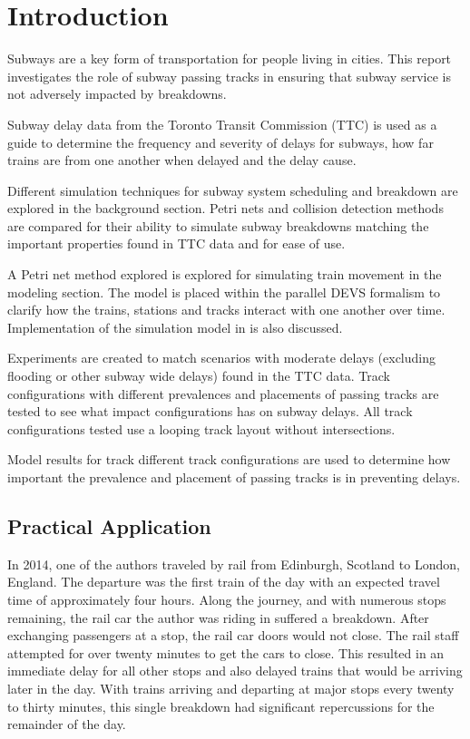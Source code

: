 \section{Introduction}

Subways are a key form of transportation for people living in cities. This
report investigates the role of subway passing tracks in ensuring that subway
service is not adversely impacted by breakdowns.

Subway delay data from the Toronto Transit Commission (TTC) is used as a guide
to determine the frequency and severity of delays for subways, how far trains 
are from one another when delayed and the delay cause.

Different simulation techniques for subway system scheduling and breakdown are
explored in the background section. Petri nets and collision detection methods
are compared for their ability to simulate subway breakdowns matching the
important properties found in TTC data and for ease of use. 

A Petri net method explored is explored for simulating train movement in the
modeling section. The model is placed within the parallel DEVS formalism to
clarify how the trains, stations and tracks interact with one another over time.
Implementation of the simulation model in  is also discussed.

Experiments are created to match scenarios with moderate delays (excluding
flooding or other subway wide delays) found in the TTC data. Track
configurations with different prevalences and placements of passing tracks are
tested to see what impact configurations has on subway delays. All track
configurations tested use a looping track layout without intersections.

Model results for track different track configurations are used to determine how
important the prevalence and placement of passing tracks is in preventing
delays. 

\subsection{Practical Application}
In 2014, one of the authors traveled by rail from Edinburgh, Scotland to London, England.  The departure was the first train of the day with an expected travel time of approximately four hours. Along the journey, and with numerous stops remaining, the rail car the author was riding in suffered a breakdown.  After exchanging passengers at a stop, the rail car doors would not close.  The rail staff attempted for over twenty minutes to get the cars to close.  This resulted in an immediate delay for all other stops and also delayed trains that would be arriving later in the day.  With trains arriving and departing at major stops every twenty to thirty minutes, this single breakdown had significant repercussions for the remainder of the day. 

